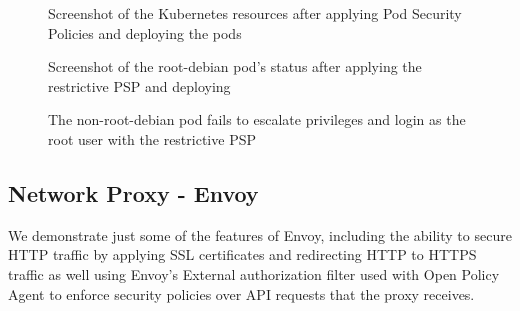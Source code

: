 \begin{figure}[t]
  \begin{center}
    \vspace{-0.2in}
    \caption{Screenshot of the Kubernetes resources after applying Pod Security Policies and deploying the pods}
    \label{fig:psp-k8s-resources}
  \end{center}
\end{figure}

\begin{figure}[t]
  \begin{center}
    \vspace{-0.2in}
    \caption{Screenshot of the root-debian pod's status after applying the restrictive PSP and deploying}
    \label{fig:psp-describe-root}
  \end{center}
\end{figure}

\begin{figure}[t]
  \begin{center}
    \vspace{-0.2in}
    \caption{The non-root-debian pod fails to escalate privileges and login as the root user with the restrictive PSP}
    \label{fig:psp-priv-esc}
  \end{center}
\end{figure}

\twocolumn

\subsection{Network Proxy - Envoy}
We demonstrate just some of the features of Envoy, including the ability to secure HTTP traffic by applying SSL
certificates and redirecting HTTP to HTTPS traffic as well using Envoy's External authorization filter
used with Open Policy Agent to enforce security policies over API requests that the proxy receives.

